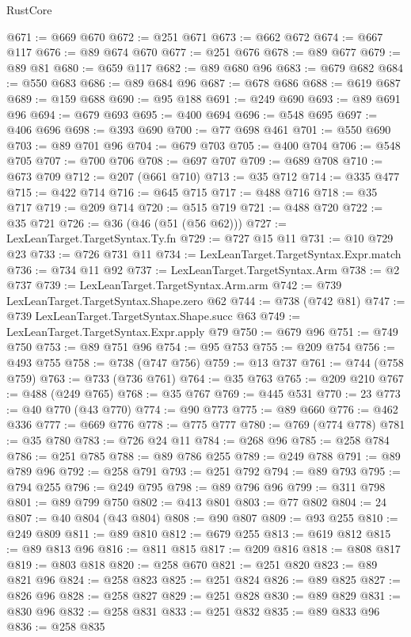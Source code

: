 \begin{lexlean}{RustCore}
\begin{coremodule}
@671 := @669 @670
@672 := @251 @671
@673 := @662 @672
@674 := @667 @117
@676 := @89 @674 @670
@677 := @251 @676
@678 := @89 @677
@679 := @89 @81
@680 := @659 @117
@682 := @89 @680 @96
@683 := @679 @682
@684 := @550 @683
@686 := @89 @684 @96
@687 := @678 @686
@688 := @619 @687
@689 := @159 @688
@690 := @95 @188
@691 := @249 @690
@693 := @89 @691 @96
@694 := @679 @693
@695 := @400 @694
@696 := @548 @695
@697 := @406 @696
@698 := @393 @690
@700 := @77 @698 @461
@701 := @550 @690
@703 := @89 @701 @96
@704 := @679 @703
@705 := @400 @704
@706 := @548 @705
@707 := @700 @706
@708 := @697 @707
@709 := @689 @708
@710 := @673 @709
@712 := @207 (@661 @710)
@713 := @35 @712
@714 := @335 @477
@715 := @422 @714
@716 := @645 @715
@717 := @488 @716
@718 := @35 @717
@719 := @209 @714
@720 := @515 @719
@721 := @488 @720
@722 := @35 @721
@726 := @36 (@46 (@51 (@56 @62)))
@727 := LexLeanTarget.TargetSyntax.Ty.fn
@729 := @727 @15 @11
@731 := @10 @729 @23
@733 := @726 @731 @11
@734 := LexLeanTarget.TargetSyntax.Expr.match
@736 := @734 @11 @92
@737 := LexLeanTarget.TargetSyntax.Arm
@738 := @2 @737
@739 := LexLeanTarget.TargetSyntax.Arm.arm
@742 := @739 LexLeanTarget.TargetSyntax.Shape.zero @62
@744 := @738 (@742 @81)
@747 := @739 LexLeanTarget.TargetSyntax.Shape.succ @63
@749 := LexLeanTarget.TargetSyntax.Expr.apply @79
@750 := @679 @96
@751 := @749 @750
@753 := @89 @751 @96
@754 := @95 @753
@755 := @209 @754
@756 := @493 @755
@758 := @738 (@747 @756)
@759 := @13 @737
@761 := @744 (@758 @759)
@763 := @733 (@736 @761)
@764 := @35 @763
@765 := @209 @210
@767 := @488 (@249 @765)
@768 := @35 @767
@769 := @445 @531
@770 := 23
@773 := @40 @770 (@43 @770)
@774 := @90 @773
@775 := @89 @660
@776 := @462 @336
@777 := @669 @776
@778 := @775 @777
@780 := @769 (@774 @778)
@781 := @35 @780
@783 := @726 @24 @11
@784 := @268 @96
@785 := @258 @784
@786 := @251 @785
@788 := @89 @786 @255
@789 := @249 @788
@791 := @89 @789 @96
@792 := @258 @791
@793 := @251 @792
@794 := @89 @793
@795 := @794 @255
@796 := @249 @795
@798 := @89 @796 @96
@799 := @311 @798
@801 := @89 @799 @750
@802 := @413 @801
@803 := @77 @802
@804 := 24
@807 := @40 @804 (@43 @804)
@808 := @90 @807
@809 := @93 @255
@810 := @249 @809
@811 := @89 @810
@812 := @679 @255
@813 := @619 @812
@815 := @89 @813 @96
@816 := @811 @815
@817 := @209 @816
@818 := @808 @817
@819 := @803 @818
@820 := @258 @670
@821 := @251 @820
@823 := @89 @821 @96
@824 := @258 @823
@825 := @251 @824
@826 := @89 @825
@827 := @826 @96
@828 := @258 @827
@829 := @251 @828
@830 := @89 @829
@831 := @830 @96
@832 := @258 @831
@833 := @251 @832
@835 := @89 @833 @96
@836 := @258 @835

\end{coremodule}
\end{lexlean}
